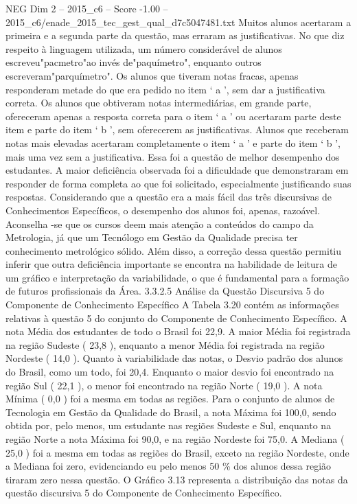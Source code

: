 \begin{textsample}{NEG Dim 2 – 2015\_c6 – Score -1.00 – 2015\_c6/enade\_2015\_tec\_gest\_qual\_d7c5047481.txt}
Muitos alunos acertaram a primeira e a segunda parte da questão, mas erraram as justificativas.
No que diz respeito à linguagem utilizada, um número considerável de alunos escreveu"pacmetro"ao invés de"paquímetro", enquanto outros escreveram"parquímetro".
Os alunos que tiveram notas fracas, apenas responderam metade do que era pedido no item ‘ a ’, sem dar a justificativa correta.
Os alunos que obtiveram notas intermediárias, em grande parte, ofereceram apenas a resposta correta para o item ‘ a ’ ou acertaram parte deste item e parte do item ‘ b ’, sem oferecerem as justificativas.
Alunos que receberam notas mais elevadas acertaram completamente o item ‘ a ’ e parte do item ‘ b ’, mais uma vez sem a justificativa.
Essa foi a questão de melhor desempenho dos estudantes.
A maior deficiência observada foi a dificuldade que demonstraram em responder de forma completa ao que foi solicitado, especialmente justificando suas respostas.
Considerando que a questão era a mais fácil das três discursivas de Conhecimentos Específicos, o desempenho dos alunos foi, apenas, razoável.
Aconselha -se que os cursos deem mais atenção a conteúdos do campo da Metrologia, já que um Tecnólogo em Gestão da Qualidade precisa ter conhecimento metrológico sólido.
Além disso, a correção dessa questão permitiu inferir que outra deficiência importante se encontra na habilidade de leitura de um gráfico e interpretação da variabilidade, o que é fundamental para a formação de futuros profissionais da Área. 3.3.2.5 Análise da Questão Discursiva 5 do Componente de Conhecimento Específico A Tabela 3.20 contém as informações relativas à questão 5 do conjunto do Componente de Conhecimento Específico.
A nota Média dos estudantes de todo o Brasil foi 22,9.
A maior Média foi registrada na região Sudeste ( 23,8 ), enquanto a menor Média foi registrada na região Nordeste ( 14,0 ).
Quanto à variabilidade das notas, o Desvio padrão dos alunos do Brasil, como um todo, foi 20,4.
Enquanto o maior desvio foi encontrado na região Sul ( 22,1 ), o menor foi encontrado na região Norte ( 19,0 ).
A nota Mínima ( 0,0 ) foi a mesma em todas as regiões.
Para o conjunto de alunos de Tecnologia em Gestão da Qualidade do Brasil, a nota Máxima foi 100,0, sendo obtida por, pelo menos, um estudante nas regiões Sudeste e Sul, enquanto na região Norte a nota Máxima foi 90,0, e na região Nordeste foi 75,0.
A Mediana ( 25,0 ) foi a mesma em todas as regiões do Brasil, exceto na região Nordeste, onde a Mediana foi zero, evidenciando eu pelo menos 50 \% dos alunos dessa região tiraram zero nessa questão.
O Gráfico 3.13 representa a distribuição das notas da questão discursiva 5 do Componente de Conhecimento Específico.

\end{textsample}
